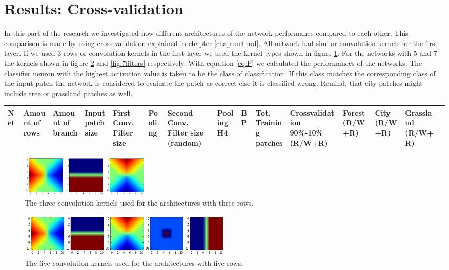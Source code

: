 \documentclass[a4paper,onecolumn]{report}
\begin{document}
\section{Results: Cross-validation}
In this part of the research we investigated how different architectures of the network performance compared to each other. This comparison is made by using cross-validation explained in chapter \ref{chap:method}. All network had similar convolution kernels for the first layer. If we used $3$ rows or convolution kernels in the first layer we used the kernel types shown in figure \ref{fig:3filters}. For the networks with $5$ and $7$ the kernels shown in figure \ref{fig:5filters} and \ref{fig:7filters} respectively.
With equation \ref{eq:P} we calculated the performances of the networks. The classifier neuron with the highest activation value is taken to be the class of classification. If this class matches the corresponding class of the input patch the network is considered to evaluate the patch as correct else it is classified wrong. Remind, that city patches might include tree or grassland patches as well.

\begin{tiny}
\begin{center}
	\begin{tabular}{| l |p{0.75cm} |p{0.75cm} |p{0.75cm} |p{0.75cm} |p{0.75cm} |p{0.75cm} |p{0.75cm} |p{0.75cm} |p{0.75cm} |p{0.75cm} |p{0.75cm} |p{0.75cm} |p{1cm} |r | }
		\hline
		Net	& Amount of rows	& Amount of branch	& Input patch size	& First Conv. Filter size	& Pooling	& Second Conv. Filter size (random)&	Pooling	H4	&BP	&Tot. Training patches	& Crossvalidation 90\%-10\% (R/W+R)	& Forest (R/W+R)&	City (R/W+R)	& Grassland (R/W+R) \\ \hline

  \end{tabular}
\end{center}
\end{tiny}	


\begin{figure}[bth]
	\centering
	\includegraphics[width=0.3\textwidth]{./images/3filters.jpg}
	\caption{The three convolution kernels used for the architectures with three rows.}
	\label{fig:3filters}
\end{figure}

\begin{figure}[bth]
	\centering
	\includegraphics[width=0.5\textwidth]{./images/5filters.jpg}
	\caption{The five convolution kernels used for the architectures with five rows.}
	\label{fig:5filters}
\end{figure}
\end{document}
